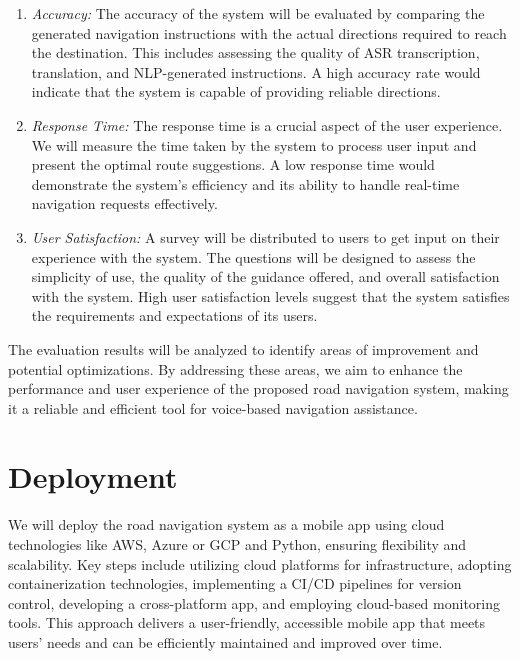\documentclass{epsrc}
\begin{document}
\begin{enumerate}
    \item {\em Accuracy:} The accuracy of the system will be evaluated by comparing the generated navigation instructions with the actual directions required to reach the destination. This includes assessing the quality of ASR transcription, translation, and NLP-generated instructions. A high accuracy rate would indicate that the system is capable of providing reliable directions.
    \item {\em Response Time:} The response time is a crucial aspect of the user experience. We will measure the time taken by the system to process user input and present the optimal route suggestions. A low response time would demonstrate the system's efficiency and its ability to handle real-time navigation requests effectively.
    \item {\em User Satisfaction:} A survey will be distributed to users to get input on their experience with the system. The questions will be designed to assess the simplicity of use, the quality of the guidance offered, and overall satisfaction with the system. High user satisfaction levels suggest that the system satisfies the requirements and expectations of its users.
\end{enumerate}
\vspace{5pt}

 The evaluation results will be analyzed to identify areas of improvement and potential optimizations. By addressing these areas, we aim to enhance the performance and user experience of the proposed road navigation system, making it a reliable and efficient tool for voice-based navigation assistance.
 \vspace{5pt}

\section{Deployment}
\vspace{5pt}

We will deploy the road navigation system as a mobile app using cloud technologies like AWS, Azure or GCP and Python, ensuring flexibility and scalability. Key steps include utilizing cloud platforms for infrastructure, adopting containerization technologies, implementing a CI/CD pipelines for version control, developing a cross-platform app, and employing cloud-based monitoring tools. This approach delivers a user-friendly, accessible mobile app that meets users' needs and can be efficiently maintained and improved over time.
\vspace{5pt}
\end{document}
